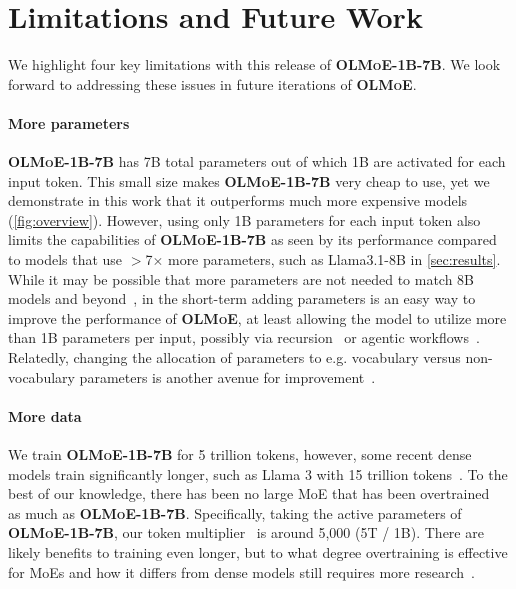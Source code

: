 \documentclass{article}
\newcommand{\model}{\textbf{\textsc{OLMoE}}}
\newcommand{\modelsmall}{\textbf{\textsc{OLMoE-1B-7B}}}
\begin{document}
\section{Limitations and Future Work} 
\label{sec:limitations}

We highlight four key limitations with this release of \modelsmall{}. We look forward to addressing these issues in future iterations of \model{}.

\paragraph{More parameters} \modelsmall{} has 7B total parameters out of which 1B are activated for each input token. This small size makes \modelsmall{} very cheap to use, yet we demonstrate in this work that it outperforms much more expensive models (\autoref{fig:overview}). However, using only 1B parameters for each input token also limits the capabilities of \modelsmall{} as seen by its performance compared to models that use $>$7$\times$ more parameters, such as Llama3.1-8B in \autoref{sec:results}. While it may be possible that more parameters are not needed to match 8B models and beyond~\citep{llmsize}, in the short-term adding parameters is an easy way to improve the performance of \model{}, at least allowing the model to utilize more than 1B parameters per input, possibly via recursion~\citep{dehghani2019universaltransformers} or agentic workflows~\citep{wang2024opendevinopenplatformai,yang2024sweagentagentcomputerinterfacesenable}. Relatedly, changing the allocation of parameters to e.g. vocabulary versus non-vocabulary parameters is another avenue for improvement~\citep{tao2024scalinglawsvocabularylarger}.

\paragraph{More data} We train \modelsmall{} for 5 trillion tokens, however, some recent dense models train significantly longer, such as Llama 3 with 15 trillion tokens~\citep{dubey2024llama3herdmodels}. To the best of our knowledge, there has been no large MoE that has been overtrained~\citep{gadre2024language} as much as \modelsmall{}. Specifically, taking the active parameters of \modelsmall{}, our token multiplier~\citep{gadre2024language} is around 5,000 (5T / 1B). There are likely benefits to training even longer, but to what degree overtraining is effective for MoEs and how it differs from dense models still requires more research~\citep{allenzhu2024physics}.
\end{document}
